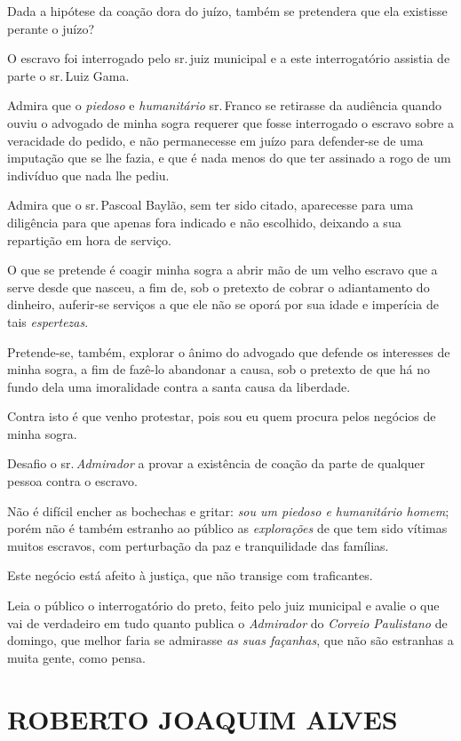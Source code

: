 Dada a hipótese da coação dora do juízo, também se pretendera que ela
existisse perante o juízo?

O escravo foi interrogado pelo sr.\,juiz municipal e a este
interrogatório assistia de parte o sr.\,Luiz Gama.

Admira que o \emph{piedoso} e \emph{humanitário} sr.\,Franco se retirasse
da audiência quando ouviu o advogado de minha sogra requerer que fosse
interrogado o escravo sobre a veracidade do pedido, e não permanecesse
em juízo para defender-se de uma imputação que se lhe fazia, e que é
nada menos do que ter assinado a rogo de um indivíduo que nada lhe
pediu.

Admira que o sr.\,Pascoal Baylão, sem ter sido citado, aparecesse para
uma diligência para que apenas fora indicado e não escolhido, deixando a
sua repartição em hora de serviço.

O que se pretende é coagir minha sogra a abrir mão de um velho escravo
que a serve desde que nasceu, a fim de, sob o pretexto de cobrar o
adiantamento do dinheiro, auferir-se serviços a que ele não se oporá por
sua idade e imperícia de tais \emph{espertezas}.

Pretende-se, também, explorar o ânimo do advogado que defende os
interesses de minha sogra, a fim de fazê-lo abandonar a causa, sob o
pretexto de que há no fundo dela uma imoralidade contra a santa causa da
liberdade.

Contra isto é que venho protestar, pois sou eu quem procura pelos
negócios de minha sogra.

Desafio o sr.\,\emph{Admirador} a provar a existência de coação da parte
de qualquer pessoa contra o escravo.

Não é difícil encher as bochechas e gritar: \emph{sou um piedoso e
humanitário homem}; porém não é também estranho ao público as
\emph{explorações} de que tem sido vítimas muitos escravos, com
perturbação da paz e tranquilidade das famílias.

Este negócio está afeito à justiça, que não transige com traficantes.

Leia o público o interrogatório do preto, feito pelo juiz municipal e
avalie o que vai de verdadeiro em tudo quanto publica o \emph{Admirador}
do \emph{Correio Paulistano} de domingo, que melhor faria se admirasse
\emph{as suas façanhas}, que não são estranhas a muita gente, como
pensa.

\section{ROBERTO JOAQUIM ALVES}

